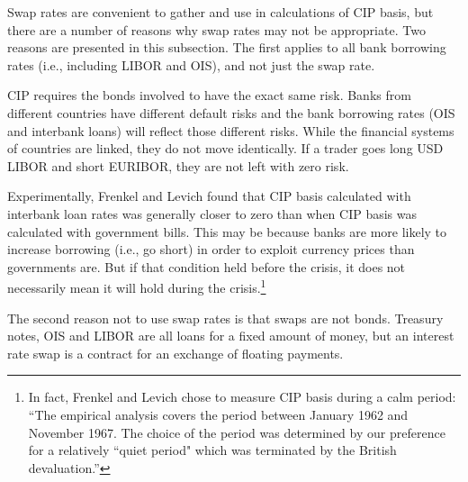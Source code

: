 
Swap rates are convenient to gather and use in calculations of CIP basis, but there are a number of reasons why swap rates may not be appropriate.  Two reasons are presented in this subsection.  The first applies to all bank borrowing rates (i.e., including LIBOR and OIS), and not just the swap rate.  


CIP requires the bonds involved to have the exact same risk.  Banks from different countries have different default risks and the bank borrowing rates (OIS and interbank loans) will reflect those different risks.  While the financial systems of countries are linked, they do not move identically.  If a trader goes long USD LIBOR and short EURIBOR, they are not left with zero risk. 


Experimentally, Frenkel and Levich\cite{Frenkel1975} found that CIP basis calculated with interbank loan rates was generally closer to zero than when CIP basis was calculated with government bills.  This may be because banks are more likely to increase borrowing (i.e., go short) in order to exploit currency prices than governments are.  But if that condition held before the crisis, it does not necessarily mean it will hold during the crisis.\footnote{In fact, Frenkel and Levich chose to measure CIP basis during a calm period: ``The empirical analysis covers the period between January 1962 and November 1967. The choice of the period was determined by our preference for a relatively ``quiet period" which was terminated by the British devaluation.''\cite{Frenkel1975}}


The second reason not to use swap rates is that swaps are not bonds.  Treasury notes, OIS and LIBOR are all loans for a fixed amount of money, but an interest rate swap is a contract for an exchange of floating payments.  

